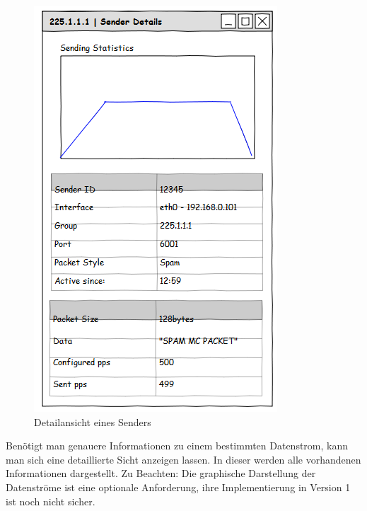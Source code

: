 \begin{figure}[H]
\centering
\includegraphics[scale=0.5]{images/gui/detailssender.png}
\caption{Detailansicht eines Senders}
\end{figure}
Benötigt man genauere Informationen zu einem bestimmten Datenstrom, kann man
sich eine detaillierte Sicht anzeigen lassen. In dieser werden alle vorhandenen
Informationen dargestellt. Zu Beachten: Die graphische Darstellung der
Datenströme ist eine optionale Anforderung, ihre Implementierung in Version 1
ist noch nicht sicher.

